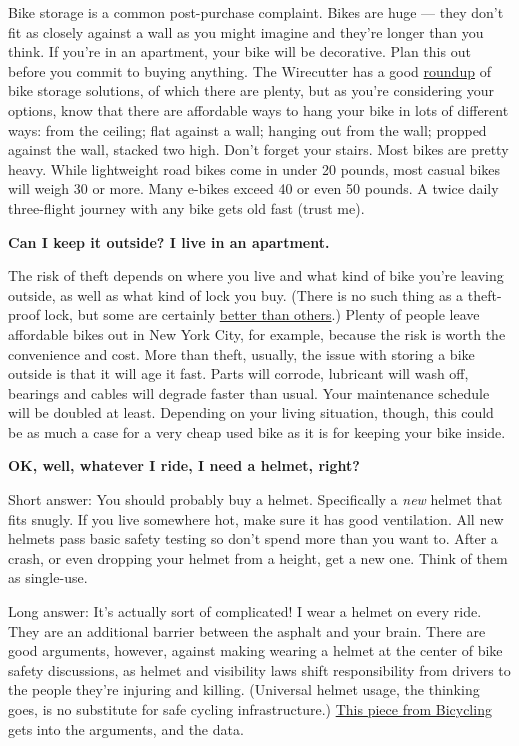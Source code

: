 Bike storage is a common post-purchase complaint. Bikes are huge ---
they don't fit as closely against a wall as you might imagine and
they're longer than you think. If you're in an apartment, your bike will
be decorative. Plan this out before you commit to buying anything. The
Wirecutter has a good
\href{https://www.nytimes3xbfgragh.onion/wirecutter/reviews/best-bike-racks-for-small-homes-and-apartments/}{roundup}
of bike storage solutions, of which there are plenty, but as you're
considering your options, know that there are affordable ways to hang
your bike in lots of different ways: from the ceiling; flat against a
wall; hanging out from the wall; propped against the wall, stacked two
high. Don't forget your stairs. Most bikes are pretty heavy. While
lightweight road bikes come in under 20 pounds, most casual bikes will
weigh 30 or more. Many e-bikes exceed 40 or even 50 pounds. A twice
daily three-flight journey with any bike gets old fast (trust me).

\textbf{Can I keep it outside? I live in an apartment.}

The risk of theft depends on where you live and what kind of bike you're
leaving outside, as well as what kind of lock you buy. (There is no such
thing as a theft-proof lock, but some are certainly
\href{https://www.nytimes3xbfgragh.onion/wirecutter/reviews/best-bike-lock/}{better
than others}.) Plenty of people leave affordable bikes out in New York
City, for example, because the risk is worth the convenience and cost.
More than theft, usually, the issue with storing a bike outside is that
it will age it fast. Parts will corrode, lubricant will wash off,
bearings and cables will degrade faster than usual. Your maintenance
schedule will be doubled at least. Depending on your living situation,
though, this could be as much a case for a very cheap used bike as it is
for keeping your bike inside.

\textbf{OK, well, whatever I ride, I need a helmet, right?}

Short answer: You should probably buy a helmet. Specifically a
\emph{new} helmet that fits snugly. If you live somewhere hot, make sure
it has good ventilation. All new helmets pass basic safety testing so
don't spend more than you want to. After a crash, or even dropping your
helmet from a height, get a new one. Think of them as single-use.

Long answer: It's actually sort of complicated! I wear a helmet on every
ride. They are an additional barrier between the asphalt and your brain.
There are good arguments, however, against making wearing a helmet at
the center of bike safety discussions, as helmet and visibility laws
shift responsibility from drivers to the people they're injuring and
killing. (Universal helmet usage, the thinking goes, is no substitute
for safe cycling infrastructure.)
\href{https://www.bicycling.com/news/a24110027/bike-helmet-safety/}{This
piece from Bicycling} gets into the arguments, and the data.

